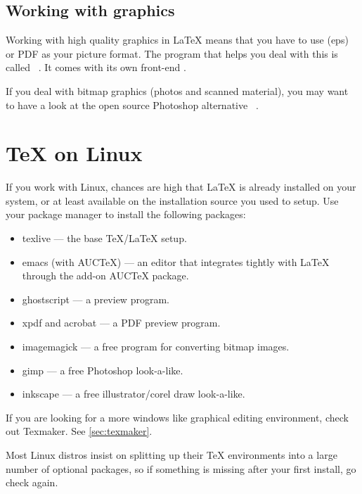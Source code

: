 \subsection{Working with graphics}

Working with high quality graphics in \LaTeX{} means that you have to use
\EPSi{} (eps) or PDF as your picture format. The program that helps you
deal with this is called ~\cite{ghostscript}. It comes with its
own front-end .

If you deal with bitmap graphics (photos and scanned material), you may want
to have a look at the open source Photoshop alternative ~\cite{gimp}.

\section{\TeX{} on Linux}

If you work with Linux, chances are high that \LaTeX{} is already installed
on your system, or at least available on the installation source you used to
setup. Use your package manager to install the following packages:

\begin{itemize}
  \item texlive --- the base \TeX{}/\LaTeX{} setup.
  \item emacs (with AUCTeX) --- an editor that integrates tightly with \LaTeX{} through the add-on AUCTeX package.
  \item ghostscript --- a \PSi{} preview program.
  \item xpdf and acrobat --- a PDF preview program.
  \item imagemagick --- a free program for converting bitmap images.
  \item gimp --- a free Photoshop look-a-like.
  \item inkscape --- a free illustrator/corel draw look-a-like.
\end{itemize}

If you are looking for a more windows like graphical editing environment,
check out Texmaker. See \autoref{sec:texmaker}.

Most Linux distros insist on splitting up their \TeX{} environments into a
large number of optional packages, so if something is missing after your
first install, go check again.
